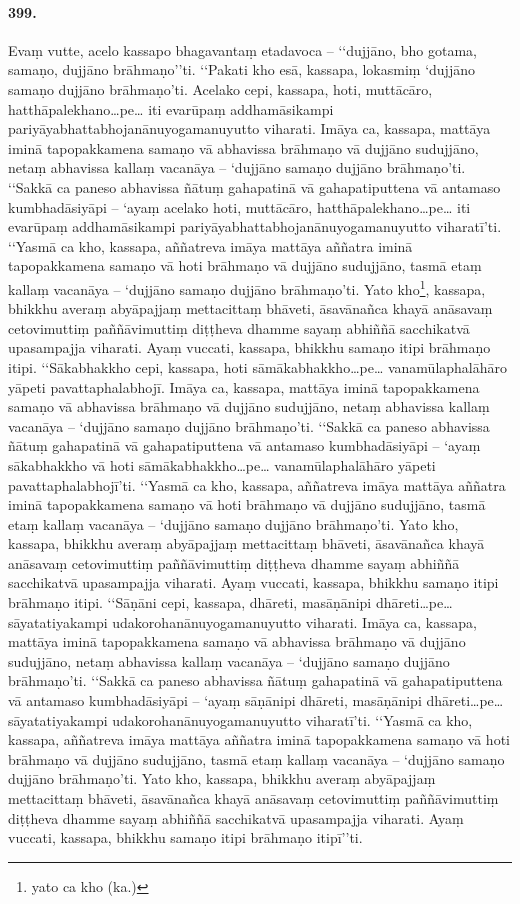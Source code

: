 \paragraph{399.} Evaṃ vutte, acelo kassapo bhagavantaṃ etadavoca – ‘‘dujjāno, bho gotama, samaṇo, dujjāno brāhmaṇo’’ti. ‘‘Pakati kho esā, kassapa, lokasmiṃ ‘dujjāno samaṇo dujjāno brāhmaṇo’ti. Acelako cepi, kassapa, hoti, muttācāro, hatthāpalekhano…pe… iti evarūpaṃ addhamāsikampi pariyāyabhattabhojanānuyogamanuyutto viharati. Imāya ca, kassapa, mattāya iminā tapopakkamena samaṇo vā abhavissa brāhmaṇo vā dujjāno sudujjāno, netaṃ abhavissa kallaṃ vacanāya – ‘dujjāno samaṇo dujjāno brāhmaṇo’ti. ‘‘Sakkā ca paneso abhavissa ñātuṃ gahapatinā vā gahapatiputtena vā antamaso kumbhadāsiyāpi – ‘ayaṃ acelako hoti, muttācāro, hatthāpalekhano…pe… iti evarūpaṃ addhamāsikampi pariyāyabhattabhojanānuyogamanuyutto viharatī’ti. ‘‘Yasmā ca kho, kassapa, aññatreva imāya mattāya aññatra iminā tapopakkamena samaṇo vā hoti brāhmaṇo vā dujjāno sudujjāno, tasmā etaṃ kallaṃ vacanāya – ‘dujjāno samaṇo dujjāno brāhmaṇo’ti. Yato kho\footnote{yato ca kho (ka.)}, kassapa, bhikkhu averaṃ abyāpajjaṃ mettacittaṃ bhāveti, āsavānañca khayā anāsavaṃ cetovimuttiṃ paññāvimuttiṃ diṭṭheva dhamme sayaṃ abhiññā sacchikatvā upasampajja viharati. Ayaṃ vuccati, kassapa, bhikkhu samaṇo itipi brāhmaṇo itipi. ‘‘Sākabhakkho cepi, kassapa, hoti sāmākabhakkho…pe… vanamūlaphalāhāro yāpeti pavattaphalabhojī. Imāya ca, kassapa, mattāya iminā tapopakkamena samaṇo vā abhavissa brāhmaṇo vā dujjāno sudujjāno, netaṃ abhavissa kallaṃ vacanāya – ‘dujjāno samaṇo dujjāno brāhmaṇo’ti. ‘‘Sakkā ca paneso abhavissa ñātuṃ gahapatinā vā gahapatiputtena vā antamaso kumbhadāsiyāpi – ‘ayaṃ sākabhakkho vā hoti sāmākabhakkho…pe… vanamūlaphalāhāro yāpeti pavattaphalabhojī’ti. ‘‘Yasmā ca kho, kassapa, aññatreva imāya mattāya aññatra iminā tapopakkamena samaṇo vā hoti brāhmaṇo vā dujjāno sudujjāno, tasmā etaṃ kallaṃ vacanāya – ‘dujjāno samaṇo dujjāno brāhmaṇo’ti. Yato kho, kassapa, bhikkhu averaṃ abyāpajjaṃ mettacittaṃ bhāveti, āsavānañca khayā anāsavaṃ cetovimuttiṃ paññāvimuttiṃ diṭṭheva dhamme sayaṃ abhiññā sacchikatvā upasampajja viharati. Ayaṃ vuccati, kassapa, bhikkhu samaṇo itipi brāhmaṇo itipi. ‘‘Sāṇāni cepi, kassapa, dhāreti, masāṇānipi dhāreti…pe… sāyatatiyakampi udakorohanānuyogamanuyutto viharati. Imāya ca, kassapa, mattāya iminā tapopakkamena samaṇo vā abhavissa brāhmaṇo vā dujjāno sudujjāno, netaṃ abhavissa kallaṃ vacanāya – ‘dujjāno samaṇo dujjāno brāhmaṇo’ti. ‘‘Sakkā ca paneso abhavissa ñātuṃ gahapatinā vā gahapatiputtena vā antamaso kumbhadāsiyāpi – ‘ayaṃ sāṇānipi dhāreti, masāṇānipi dhāreti…pe… sāyatatiyakampi udakorohanānuyogamanuyutto viharatī’ti. ‘‘Yasmā ca kho, kassapa, aññatreva imāya mattāya aññatra iminā tapopakkamena samaṇo vā hoti brāhmaṇo vā dujjāno sudujjāno, tasmā etaṃ kallaṃ vacanāya – ‘dujjāno samaṇo dujjāno brāhmaṇo’ti. Yato kho, kassapa, bhikkhu averaṃ abyāpajjaṃ mettacittaṃ bhāveti, āsavānañca khayā anāsavaṃ cetovimuttiṃ paññāvimuttiṃ diṭṭheva dhamme sayaṃ abhiññā sacchikatvā upasampajja viharati. Ayaṃ vuccati, kassapa, bhikkhu samaṇo itipi brāhmaṇo itipī’’ti.

